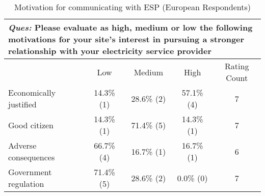 \begin{table}[h]
\begin{center}
\begin{tabular}{|l|c|c|c|c|}
\hline
\multicolumn{5}{|p{.72\textwidth}|}{\emph{Ques:} Please evaluate as high, medium or low the following motivations for your site's interest in pursuing a stronger relationship with your electricity service provider}\\
\hline
& Low & Medium & High & Rating Count \\
\hline
Economically justified & 14.3\% (1) & 28.6\% (2) & 57.1\% (4) & 7 \\
\hline
Good citizen & 14.3\% (1) & 71.4\% (5) & 14.3\% (1) & 7 \\
\hline
Adverse consequences & 66.7\% (4) & 16.7\% (1) & 16.7\% (1) & 6 \\
\hline
Government regulation & 71.4\% (5) & 28.6\% (2) & 0.0\% (0) & 7 \\
\hline
\end{tabular}
\end{center}
\caption{Motivation for communicating with ESP (European Respondents)}
\label{fig:table2}
\end{table}
